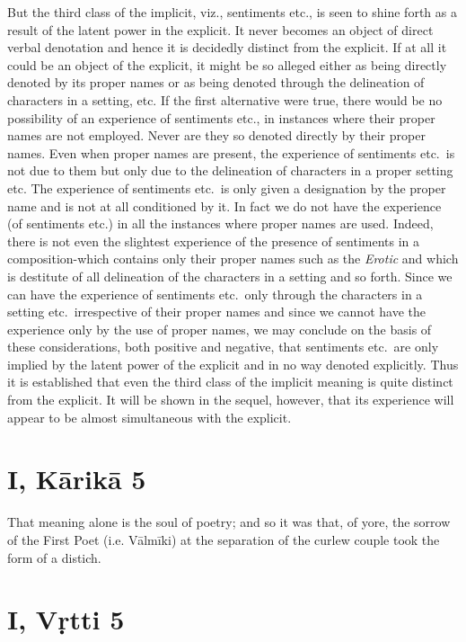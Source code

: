 \documentclass[12pt]{book}
\begin{document}
But the third class of the implicit, viz., sentiments etc., is
seen to shine forth as a result of the latent power in the explicit.
It never becomes an object of direct verbal denotation and hence
it is decidedly distinct from the explicit. If at all it could be an
object of the explicit, it might be so alleged either as being
directly denoted by its proper names or as being denoted through
the delineation of characters in a setting, etc. If the first alternative were true, there would be no possibility of an experience
of sentiments etc., in instances where their proper names are not
employed. Never are they so denoted directly by their proper
names. Even when proper names are present, the experience of
sentiments etc.\ is not due to them but only due to the delineation
of characters in a proper setting etc. The experience of sentiments
etc.\ is only given a designation by the proper name and is not at
all conditioned by it. In fact we do not have the experience (of
sentiments etc.) in all the instances where proper names are used.
Indeed, there is not even the slightest experience of the presence
of sentiments in a composition-which contains only their proper
names such as the \textit{Erotic} and which is destitute of all delineation
of the characters in a setting and so forth. Since we can have
the experience of sentiments etc.\ only through the characters in
a setting etc.\ irrespective of their proper names and since we
cannot have the experience only by the use of proper names, we
may conclude on the basis of these considerations, both positive
and negative, that sentiments etc.\ are only implied by the latent
power of the explicit and in no way denoted explicitly. Thus
it is established that even the third class of the implicit meaning
is quite distinct from the explicit. It will be shown in the sequel,
however, that its experience will appear to be almost simultaneous
with the explicit.

\section{I, Kārikā 5}

That meaning alone is the soul of poetry; and so it was
that, of yore, the sorrow of the First Poet (i.e. Vālmīki) at
the separation of the curlew couple took the form of a
distich.

\section{I, Vṛtti 5}
\end{document}
